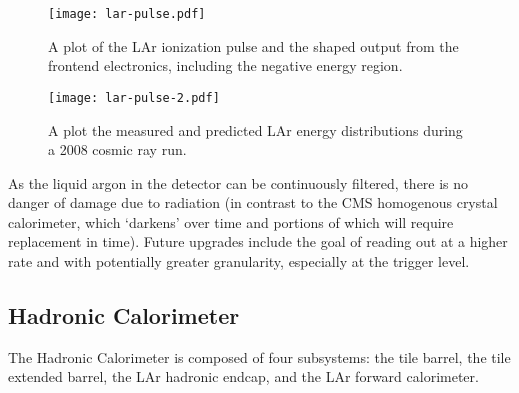 
\begin{figure}
\centering
\texttt{[image: lar-pulse.pdf]}
\label{fig:detector:lar-pulse}
\caption{A plot of the LAr ionization pulse and the shaped output from the frontend electronics, including the negative energy region.}
\end{figure}



\begin{figure}
\centering
\texttt{[image: lar-pulse-2.pdf]}
\label{fig:detector:lar-pulse-2}
\caption{A plot the measured and predicted LAr energy distributions during a 2008 cosmic ray run.}
\end{figure}


As the liquid argon in the detector can be continuously filtered, there is no danger of damage due to radiation (in contrast to the CMS homogenous crystal calorimeter, which `darkens' over time and portions of which will require replacement in time). Future upgrades include the goal of reading out at a higher rate and with potentially greater granularity, especially at the trigger level.



\subsection{Hadronic Calorimeter}

The Hadronic Calorimeter is composed of four subsystems: the tile barrel, the tile extended barrel, the LAr hadronic endcap, and the LAr forward calorimeter. 

